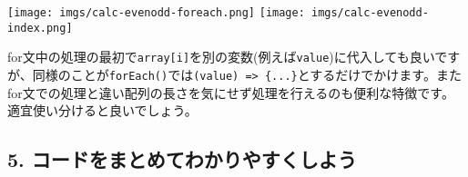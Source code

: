 \begin{Shaded}
\begin{Highlighting}[]
\OperatorTok{=}\NormalTok{ []}\OperatorTok{;}
\NormalTok{ (}\OperatorTok{=} \OperatorTok{;}\OperatorTok{\textless{}} \OperatorTok{;}\OperatorTok{++}\NormalTok{) \{}
\NormalTok{(}\NormalTok{(}\NormalTok{() }\OperatorTok{*}  \OperatorTok{*}\OperatorTok{;}
\NormalTok{\}}

\NormalTok{ (}\OperatorTok{=} \OperatorTok{;}\OperatorTok{\textless{}} \OperatorTok{;}\OperatorTok{++}\NormalTok{) \{}
    \OperatorTok{\%}  \OperatorTok{===} \NormalTok{) \{}
        \NormalTok{(}\VerbatimStringTok{\textasciigrave{}}\SpecialCharTok{$\{}\SpecialCharTok{\}}\NormalTok{)}\OperatorTok{;}
\NormalTok{    \} }\NormalTok{ \{}
        \NormalTok{(}\VerbatimStringTok{\textasciigrave{}}\SpecialCharTok{$\{}\SpecialCharTok{\}}\NormalTok{)}\OperatorTok{;}
\NormalTok{    \}}
\NormalTok{\}}
\end{Highlighting}
\end{Shaded}

\texttt{[image: imgs/calc-evenodd-foreach.png]}
\texttt{[image: imgs/calc-evenodd-index.png]}

for文中の処理の最初で\texttt{array{[}i{]}}を別の変数(例えば\texttt{value})に代入しても良いですが、同様のことが\texttt{forEach()}では\texttt{(value)\ =\textgreater{}\ \{...\}}とするだけでかけます。またfor文での処理と違い配列の長さを気にせず処理を行えるのも便利な特徴です。適宜使い分けると良いでしょう。

\subsection{5.
コードをまとめてわかりやすくしよう}\label{ux30b3ux30fcux30c9ux3092ux307eux3068ux3081ux3066ux308fux304bux308aux3084ux3059ux304fux3057ux3088ux3046}

